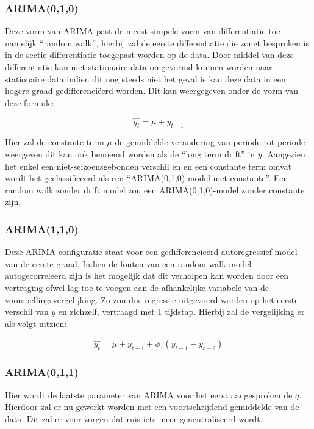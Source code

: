 \subsubsection{ARIMA(0,1,0)}

Deze vorm van ARIMA past de meest simpele vorm van differentiatie toe namelijk ``random walk'', hierbij zal de eerste differentiatie die zonet besproken is in de sectie differentiatie toegepast worden op de data. Door middel van deze differentiatie kan niet-stationaire data omgevormd kunnen worden naar stationaire data indien dit nog steeds niet het geval is kan deze data in een hogere graad gedifferenci\"{e}erd worden. Dit kan weergegeven onder de vorm van deze formule:

\begin{equation}
\hat{y_t} = \mu + y_{t-1}
\end{equation}

Hier zal de constante term $\mu$ de gemiddelde verandering van periode tot periode weergeven dit kan ook benoemd worden als de ``long term drift'' in $y$. Aangezien het enkel een niet-seizoensgebonden verschil en en een constante term omvat wordt het geclassificeerd als een ``ARIMA(0,1,0)-model met constante''. Een random walk zonder drift model zou een ARIMA(0,1,0)-model zonder constante zijn.

\clearpage
\subsubsection{ARIMA(1,1,0)}

Deze ARIMA configuratie staat voor een gedifferenci\"{e}erd autoregressief model van de eerste graad. Indien de fouten van een random walk model autogecorreleerd zijn is het mogelijk dat dit verholpen kan worden door een vertraging ofwel lag toe te voegen aan de afhankelijke variabele van de voorspellingsvergelijking. Zo zou dus regressie uitgevoerd worden op het eerste verschil van $y$ en zichzelf, vertraagd met 1 tijdstap. Hierbij zal de vergelijking er als volgt uitzien:

\begin{equation}
\hat{y_t} = \mu + y_{t-1} + \phi_1 (y_{t-1} - y_{t-2})
\end{equation}

\subsubsection{ARIMA(0,1,1)}

Hier wordt de laatste parameter van ARIMA voor het eerst aangesproken de $q$. Hierdoor zal er nu gewerkt worden met een voortschrijdend gemiddelde van de data. Dit zal er voor zorgen dat ruis iets meer geneutraliseerd wordt.

